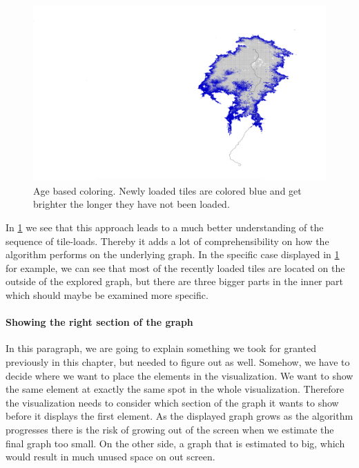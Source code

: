 \documentclass
[
    paper = a4,
    pagesize,
    12 pt,
    oneside,                       %
    open = right,
    DIV = calc,
    BCOR = 0 mm,                   %
    bibtotoc
]
{scrbook}
\begin{document}
\begin{figure}[H]
    \includegraphics[width=\textwidth]{Images/vis-aged-coloring.png}
\caption[]{Age based coloring. Newly loaded tiles are colored blue and get brighter the longer they have not been loaded.}
\label{fig:color_aged_tile}
\end{figure}

In \cref{fig:color_aged_tile} we see that this approach leads to a much better understanding of the sequence of tile-loads.
Thereby it adds a lot of comprehensibility on how the algorithm performs on the underlying graph.
In the specific case displayed in \cref{fig:color_aged_tile} for example, we can see that most of the recently loaded tiles are located on the outside of the explored graph, but there are three bigger parts in the inner part which should maybe be examined more specific.

\paragraph{Showing the right section of the graph}
In this paragraph, we are going to explain something we took for granted previously in this chapter, but needed to figure out as well.
Somehow, we have to decide where we want to place the elements in the visualization.
We want to show the same element at exactly the same spot in the whole visualization.
Therefore the visualization needs to consider which section of the graph it wants to show before it displays the first element.
As the displayed graph grows as the algorithm progresses there is the risk of growing out of the screen when we estimate the final graph too small.
On the other side, a graph that is estimated to big, which would result in much unused space on out screen.
\end{document}
